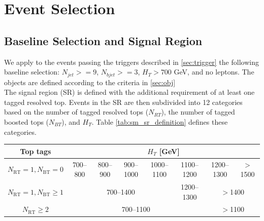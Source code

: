 \documentclass[twoside]{article}
\begin{document}
\clearpage
\section{Event Selection}
\subsection{Baseline Selection and Signal Region}
We apply to the events passing the triggers described in \autoref{sec:trigger} the following baseline selection: $N_{jet}>=9$, $N_{bjet}>=3$, $H_T>700$ GeV, and no leptons. The objects are defined according to the criteria in \autoref{sec:obj}
\\

The signal region (SR) is defined with the additional requirement of at least one tagged resolved top. Events in the SR are then subdivided into 12 categories based on the number of tagged resolved tops ($N_{RT}$), the number of tagged boosted tops ($N_{BT}$), and $H_T$. Table \ref{tab:sm_sr_definition} defines these categories.

\begin{table}[ht]
\centering
\begin{tabular}{|c|*{7}{c|}}
\hline
\textbf{Top tags} & \multicolumn{7}{c|}{$H_T$ [GeV]} \\
\hline
$N_\text{RT} = 1, N_\text{BT} = 0$ & 700--800 & 800--900 & 900--1000 & 1000--1100 & 1100--1200 & 1200--1300 & $>$1500 \\
\hline
$N_\text{RT} = 1, N_\text{BT} \geq 1$ & \multicolumn{4}{c|}{700--1400} & 1200--1300 & \multicolumn{2}{c|}{$>$1400} \\
\hline
$N_\text{RT} \geq 2$ & \multicolumn{5}{c|}{700--1100} & \multicolumn{2}{c|}{$>$1100} \\
\hline
\end{tabular}
\end{table}
\label{tab:sm_sr_definition}
\end{document}
